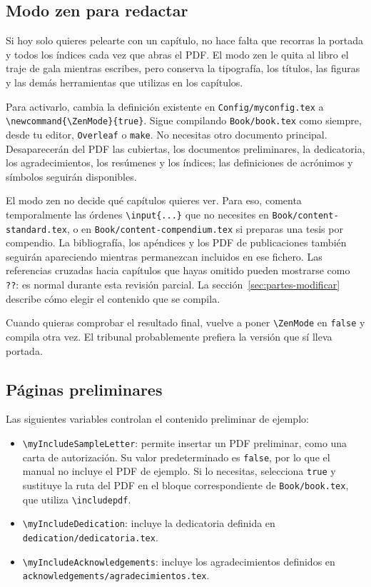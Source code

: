 \subsection{Modo zen para redactar}
\label{sec:modo-zen}

Si hoy solo quieres pelearte con un capítulo, no hace falta que recorras la portada y todos los índices cada vez que abras el PDF. El modo zen le quita al libro el traje de gala mientras escribes, pero conserva la tipografía, los títulos, las figuras y las demás herramientas que utilizas en los capítulos.

Para activarlo, cambia la definición existente en \texttt{Config/myconfig.tex} a \verb|\newcommand{\ZenMode}{true}|. Sigue compilando \texttt{Book/book.tex} como siempre, desde tu editor, \texttt{Overleaf} o \texttt{make}. No necesitas otro documento principal. Desaparecerán del PDF las cubiertas, los documentos preliminares, la dedicatoria, los agradecimientos, los resúmenes y los índices; las definiciones de acrónimos y símbolos seguirán disponibles.

El modo zen no decide qué capítulos quieres ver. Para eso, comenta temporalmente las órdenes \texttt{\textbackslash{}input\{...\}} que no necesites en \texttt{Book/content-standard.tex}, o en \texttt{Book/content-compendium.tex} si preparas una tesis por compendio. La bibliografía, los apéndices y los PDF de publicaciones también seguirán apareciendo mientras permanezcan incluidos en ese fichero. Las referencias cruzadas hacia capítulos que hayas omitido pueden mostrarse como \texttt{??}: es normal durante esta revisión parcial. La sección~\ref{sec:partes-modificar} describe cómo elegir el contenido que se compila.

Cuando quieras comprobar el resultado final, vuelve a poner \texttt{\textbackslash{}ZenMode} en \texttt{false} y compila otra vez. El tribunal probablemente prefiera la versión que sí lleva portada.

\subsection{Páginas preliminares}

Las siguientes variables controlan el contenido preliminar de ejemplo:

\begin{itemize}
  \item \texttt{\textbackslash{}myIncludeSampleLetter}: permite insertar un PDF preliminar, como una carta de autorización. Su valor predeterminado es \texttt{false}, por lo que el manual no incluye el PDF de ejemplo. Si lo necesitas, selecciona \texttt{true} y sustituye la ruta del PDF en el bloque correspondiente de \texttt{Book/book.tex}, que utiliza \texttt{\textbackslash{}includepdf}.
  \item \texttt{\textbackslash{}myIncludeDedication}: incluye la dedicatoria definida en \texttt{dedication/dedicatoria.tex}.
  \item \texttt{\textbackslash{}myIncludeAcknowledgements}: incluye los agradecimientos definidos en \texttt{acknowledgements/agradecimientos.tex}.
\end{itemize}

